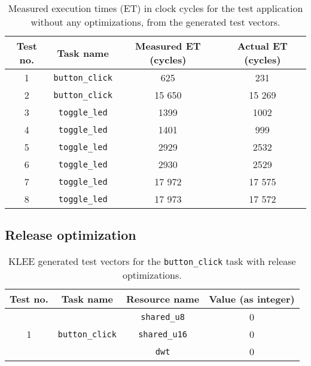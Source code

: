 \begin{table}[H]
    \centering
    \begin{tabular}{|c | c | c | c|}
        \hline
        Test no. & Task name & Measured ET (cycles) & Actual ET (cycles) \\ [0.5ex]
        \hline
        1 & \texttt{button\_click} & 625 & 231 \\
        \hline
        2 & \texttt{button\_click} & 15 650 & 15 269 \\
        \hline
        3 & \texttt{toggle\_led} & 1399 & 1002  \\
        \hline
        4 & \texttt{toggle\_led} & 1401  & 999 \\
        \hline
        5 & \texttt{toggle\_led} & 2929  & 2532 \\
        \hline
        6 & \texttt{toggle\_led} & 2930 & 2529 \\
        \hline
        7 & \texttt{toggle\_led} & 17 972 & 17 575 \\
        \hline
        8 & \texttt{toggle\_led} & 17 973 & 17 572 \\
        \hline
    \end{tabular}
    \caption{Measured execution times (ET) in clock cycles for the test application without any optimizations, from the generated test vectors.}
    \label{tab:evaldebugmeasure}
\end{table}

\subsection{Release optimization}

\begin{table}[H]
    \centering
    \begin{longtable}{|c|c|c|c|}
    \hline
    Test no. & Task name & Resource name & Value (as integer) \\ \hline
    \multirow{3}{*}{1} & \multirow{3}{*}{\texttt{button\_click}} & \texttt{shared\_u8}  & 0 \\ \cline{3-4} 
                       &                                         & \texttt{shared\_u16} & 0 \\ \cline{3-4} 
                       &                                         & \texttt{dwt}         & 0 \\ \hline
    \end{longtable}
    \caption{KLEE generated test vectors for the \texttt{button\_click} task with release optimizations.}
    \label{tab:evalreleasetestsbutton}
\end{table}

